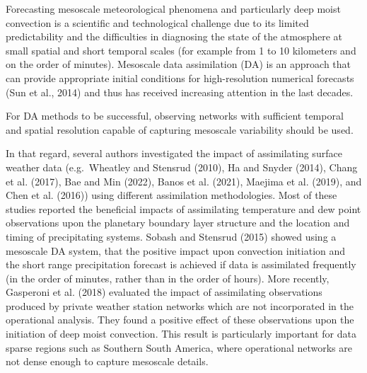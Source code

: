 \documentclass[authoryear,preprint,review,12pt]{elsarticle} %
\begin{document}
Forecasting mesoscale meteorological phenomena and particularly deep moist convection is a scientific and technological challenge due to its limited predictability and the difficulties in diagnosing the state of the atmosphere at small spatial and short temporal scales (for example from 1 to 10 kilometers and on the order of minutes). Mesoscale data assimilation (DA) is an approach that can provide appropriate initial conditions for high-resolution numerical forecasts (Sun et al., 2014) and thus has received increasing attention in the last decades.

For DA methods to be successful, observing networks with sufficient temporal and spatial resolution capable of capturing mesoscale variability should be used.

In that regard, several authors investigated the impact of assimilating surface weather data (e.g.~Wheatley and Stensrud (2010), Ha and Snyder (2014), Chang et al. (2017), Bae and Min (2022), Banos et al. (2021), Maejima et al. (2019), and Chen et al. (2016)) using different assimilation methodologies. Most of these studies reported the beneficial impacts of assimilating temperature and dew point observations upon the planetary boundary layer structure and the location and timing of precipitating systems. Sobash and Stensrud (2015) showed using a mesoscale DA system, that the positive impact upon convection initiation and the short range precipitation forecast is achieved if data is assimilated frequently (in the order of minutes, rather than in the order of hours). More recently, Gasperoni et al. (2018) evaluated the impact of assimilating observations produced by private weather station networks which are not incorporated in the operational analysis. They found a positive effect of these observations upon the initiation of deep moist convection. This result is particularly important for data sparse regions such as Southern South America, where operational networks are not dense enough to capture mesoscale details.
\end{document}
